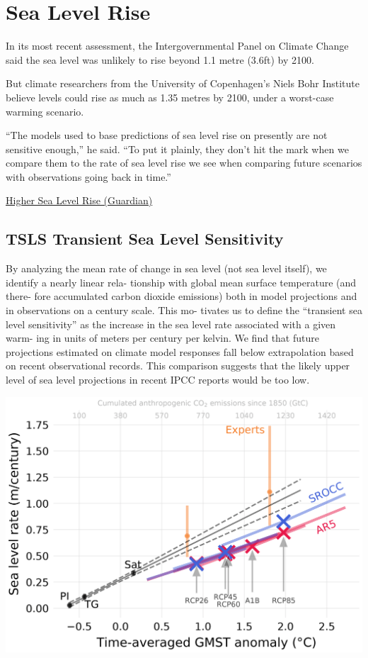 \documentclass[
]{book}
\begin{document}
\hypertarget{sea-level-rise}{%
\section{Sea Level Rise}\label{sea-level-rise}}

In its most recent assessment, the Intergovernmental Panel on Climate Change said the sea level was unlikely to rise beyond 1.1 metre (3.6ft) by 2100.

But climate researchers from the University of Copenhagen's Niels Bohr Institute believe levels could rise as much as 1.35 metres by 2100, under a worst-case warming scenario.

``The models used to base predictions of sea level rise on presently are not sensitive enough,'' he said. ``To put it plainly, they don't hit the mark when we compare them to the rate of sea level rise we see when comparing future scenarios with observations going back in time.''

\href{https://www.theguardian.com/environment/2021/feb/02/sea-level-rise-could-be-worse-than-feared-warn-researchers}{Higher Sea Level Rise (Guardian)}

\hypertarget{tsls-transient-sea-level-sensitivity}{%
\subsection{TSLS Transient Sea Level Sensitivity}\label{tsls-transient-sea-level-sensitivity}}

By analyzing the mean rate of change in sea
level (not sea level itself), we identify a nearly linear rela-
tionship with global mean surface temperature (and there-
fore accumulated carbon dioxide emissions) both in model
projections and in observations on a century scale. This mo-
tivates us to define the ``transient sea level sensitivity'' as the
increase in the sea level rate associated with a given warm-
ing in units of meters per century per kelvin. We find that
future projections estimated on climate model responses fall
below extrapolation based on recent observational records.
This comparison suggests that the likely upper level of sea
level projections in recent IPCC reports would be too low.

\includegraphics{fig/Transient_Sea_Level_Sensitivity.png}
\end{document}

